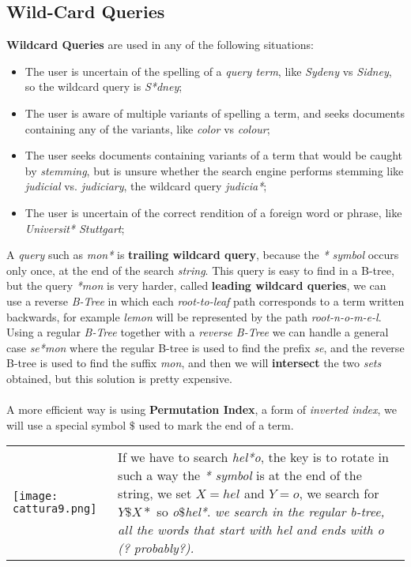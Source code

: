 \documentclass{article}
\begin{document}
\subsection{Wild-Card Queries}
\textbf{Wildcard Queries} are used in any of the following situations:
\begin{itemize}
\item The user is uncertain of the spelling of a \emph{query term}, like \emph{Sydeny} vs \emph{Sidney}, so the wildcard query is \emph{S*dney};
\item The user is aware of multiple variants of spelling a term, and seeks documents containing any of the variants, like \emph{color} vs \emph{colour};
\item The user seeks documents containing variants of a term that would be caught by \emph{stemming}, but is unsure whether the search engine performs stemming like \emph{judicial} vs. \emph{judiciary}, the wildcard query \emph{judicia*}; 
\item The user is uncertain of the correct rendition of a foreign word or phrase, like \emph{Universit* Stuttgart};
\end{itemize}
A \emph{query} such as \emph{mon*} is \textbf{trailing wildcard query}, because the \emph{* symbol} occurs only once, at the end of the search \emph{string}. This query is easy to find in a B-tree, but the query \emph{*mon} is very harder, called \textbf{leading wildcard queries}, we can use a reverse \emph{B-Tree} in which each \emph{root-to-leaf} path corresponds to a term written backwards, for example \emph{lemon} will be represented by the path \emph{root-n-o-m-e-l}. Using a regular\emph{ B-Tree} together with a \emph{reverse B-Tree} we can handle a general case \emph{se*mon} where the regular B-tree is used to find the prefix \emph{se}, and the reverse B-tree is used to find the suffix \emph{mon}, and then we will \textbf{intersect} the two \emph{sets} obtained, but this solution is pretty expensive. \\\\
A more efficient way is using \textbf{Permutation Index}, a form of \emph{inverted index}, we will use a special symbol $\$$ used to mark the end of a term.\\
\begin{tabular}{C{7cm}  L{6.5cm}}
        \texttt{[image: cattura9.png]} & 
	If we have to search \emph{hel*o}, the key is to rotate in such a way the \emph{* symbol} is at the end of the string, we set $X = hel$ and $Y=o$, we search for $Y\$X*$ so \emph{o$\$$hel*}. \emph{we search in the regular b-tree, all the words that start with hel and ends with o (? probably?).}
\end{tabular}\\\\
\end{document}
